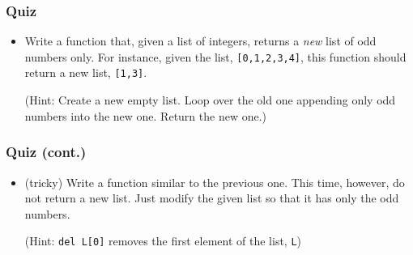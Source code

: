 \documentclass{beamer}
\begin{document}
\begin{frame}[fragile]
\frametitle{Quiz}
\begin{itemize}
\item<1-> Write a function that, given a list
    of integers, returns a \emph{new} list of odd numbers
    only. For instance, given the list, \lstinline{[0,1,2,3,4]},
    this function should return a new list,
    \lstinline{[1,3]}.

    (Hint: Create a new empty list. Loop over the
     old one appending only odd numbers into the new one.
     Return the new one.)
% 
\end{itemize}
\end{frame}

\begin{frame}[fragile]
\frametitle{Quiz (cont.)}
\begin{itemize}
\item (tricky) Write a function similar to the previous one.
    This time, however, do not return a new list.
    Just modify the given list so that it has only
    the odd numbers.

    (Hint: \lstinline{del L[0]} removes
    the first element of the list, \lstinline{L})
\end{itemize}
\end{frame}
\end{document}
